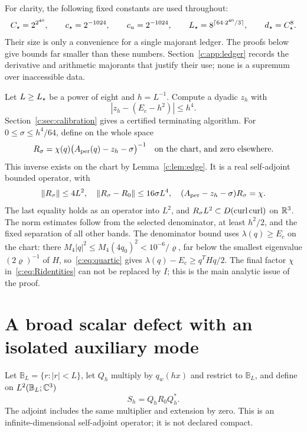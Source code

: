 For clarity, the following fixed constants are used throughout:
\begin{equation}
 C_\star=2^{2^{40}},\qquad c_\star=2^{-1024},\qquad
 c_u=2^{-1024},\qquad
 L_\star=8^{\lceil64\cdot2^{40}/3\rceil},\qquad
 d_\star=C_\star^8.                                         \label{c:eq:masterconstants}
\end{equation}
Their size is only a convenience for a single majorant ledger. The proofs
below give bounds far smaller than these numbers. Section~\ref{c:app:ledger}
records the derivative and arithmetic majorants that justify their use;
none is a supremum over inaccessible data.

Let $L\ge L_\star$ be a power of eight and $h=L^{-1}$. Compute a dyadic $z_h$
with
\begin{equation}
 |z_h-(E_c-h^2)|\le h^4.                              \label{c:eq:z}
\end{equation}
Section~\ref{c:sec:calibration} gives a certified terminating algorithm.
For $0\le\sigma\le h^4/64$, define on the whole space
\begin{equation}
 R_\sigma=\chi(q)\big(A_{\rm per}(q)-z_h-\sigma\big)^{-1}
 \quad\text{on the chart, and zero elsewhere}.         \label{c:eq:R}
\end{equation}
This inverse exists on the chart by Lemma~\ref{c:lem:edge}. It is a real
self-adjoint bounded operator, with
\begin{equation}
 \left\lVert R_\sigma\right\rVert\le4L^2,\quad
 \left\lVert R_\sigma-R_0\right\rVert\le16\sigma L^4,\quad
 (A_{\rm per}-z_h-\sigma)R_\sigma=\chi.               \label{c:eq:Ridentities}
\end{equation}
The last equality holds as an operator into $L^2$, and
$R_\sigma L^2\subset D(\operatorname{curl}\operatorname{curl})$ on $\mathbb R^3$.
The norm estimates follow from the selected denominator, at least
$h^2/2$, and the fixed separation of all other bands. The denominator
bound uses $\lambda(q)\ge E_c$ on the chart: there
$M_4|q|^2\le M_4(4q_0)^2<10^{-6}/\varrho$, far below the smallest
eigenvalue $(2\varrho)^{-1}$ of $H$, so~\eqref{c:eq:quartic} gives
$\lambda(q)-E_c\ge q^THq/2$. The final factor
$\chi$ in~\eqref{c:eq:Ridentities} can not be replaced by $I$; this is
the main analytic issue of the proof.

\section{A broad scalar defect with an isolated auxiliary mode}
\label{c:sec:defect}

Let $\mathbb B_L=\{r:|r|<L\}$, let $Q_h$ multiply by $q_w(hx)$ and restrict
to $\mathbb B_L$, and define on $L^2(\mathbb B_L;\mathbb C^3)$
\begin{equation}
 S_h=Q_hR_0Q_h^*.                                    \label{c:eq:Sh}
\end{equation}
The adjoint includes the same multiplier and extension by zero. This is
an infinite-dimensional self-adjoint operator; it is not declared compact.

